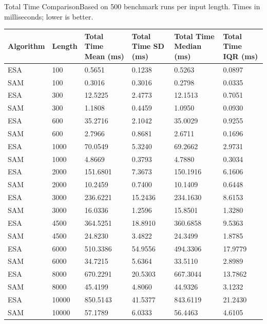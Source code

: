 \begin{benchmarktable}{Total Time Comparison}{Based on 500 benchmark runs per input length. Times in milliseconds; lower is better.}
\begin{tabularx}{\textwidth}{|X|X|X|X|X|X|}
\toprule
Algorithm & Length & Total Time Mean (ms) & Total Time SD (ms) & Total Time Median (ms) & Total Time IQR (ms) \\
\midrule
ESA & 100 & 0.5651 & 0.1238 & 0.5263 & 0.0897 \\
SAM & 100 & 0.3016 & 0.3016 & 0.2798 & 0.0335 \\
\hline
ESA & 300 & 12.5225 & 2.4773 & 12.1513 & 0.7051 \\
SAM & 300 & 1.1808 & 0.4459 & 1.0950 & 0.0930 \\
\hline
ESA & 600 & 35.2716 & 2.1042 & 35.0029 & 0.9255 \\
SAM & 600 & 2.7966 & 0.8681 & 2.6711 & 0.1696 \\
\hline
ESA & 1000 & 70.0549 & 5.3240 & 69.2662 & 2.9731 \\
SAM & 1000 & 4.8669 & 0.3793 & 4.7880 & 0.3034 \\
\hline
ESA & 2000 & 151.6801 & 7.3673 & 150.1916 & 6.1606 \\
SAM & 2000 & 10.2459 & 0.7400 & 10.1409 & 0.6448 \\
\hline
ESA & 3000 & 236.6221 & 15.2436 & 234.1630 & 8.6153 \\
SAM & 3000 & 16.0336 & 1.2596 & 15.8501 & 1.3280 \\
\hline
ESA & 4500 & 364.5251 & 18.8910 & 360.6858 & 9.5363 \\
SAM & 4500 & 24.8230 & 3.4822 & 24.3499 & 1.8785 \\
\hline
ESA & 6000 & 510.3386 & 54.9556 & 494.3306 & 17.9779 \\
SAM & 6000 & 34.7215 & 5.6364 & 33.5110 & 2.8989 \\
\hline
ESA & 8000 & 670.2291 & 20.5303 & 667.3044 & 13.7862 \\
SAM & 8000 & 45.4199 & 4.8060 & 44.9326 & 3.1232 \\
\hline
ESA & 10000 & 850.5143 & 41.5377 & 843.6119 & 21.2430 \\
SAM & 10000 & 57.1789 & 6.0333 & 56.4463 & 4.6105 \\
\bottomrule
\end{tabularx}
\end{benchmarktable}

